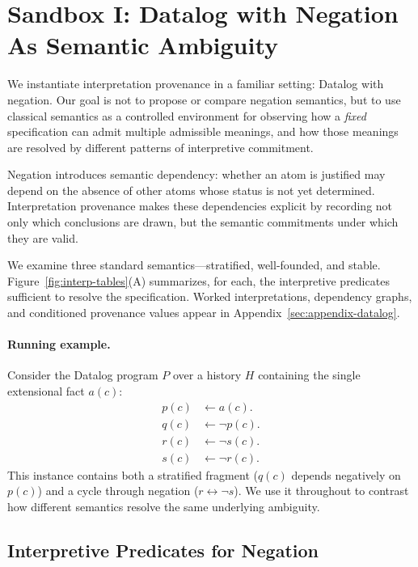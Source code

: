 \documentclass[acmsmall,nonacm]{acmart}
\theoremstyle{remark}
\numberwithin{definition}{section}
\numberwithin{theorem}{section}
\numberwithin{lemma}{section}
\numberwithin{corollary}{section}
\numberwithin{remark}{section}
\numberwithin{example}{section}
\numberwithin{observation}{section}
\numberwithin{assumption}{section}
\begin{document}
\section{Sandbox I: Datalog with Negation As Semantic Ambiguity}
\label{sec:negation}

We instantiate interpretation provenance in a familiar setting: Datalog with
negation.
Our goal is not to propose or compare negation semantics, but to use classical
semantics as a controlled environment for observing how a \emph{fixed}
specification can admit multiple admissible meanings, and how those meanings are
resolved by different patterns of interpretive commitment.

Negation introduces semantic dependency: whether an atom is justified may depend
on the absence of other atoms whose status is not yet determined.
Interpretation provenance makes these dependencies explicit by recording not only
which conclusions are drawn, but the semantic commitments under which they are
valid.

We examine three standard semantics—stratified, well-founded, and stable.
Figure~\ref{fig:interp-tables}(A) summarizes, for each, the interpretive predicates
sufficient to resolve the specification.
Worked interpretations, dependency graphs, and conditioned provenance values
appear in Appendix~\ref{sec:appendix-datalog}.

\paragraph{Running example.}
Consider the Datalog program $P$ over a history $H$ containing the single
extensional fact $a(c)$:
\begin{align*}
  p(c) &\leftarrow a(c).\\
  q(c) &\leftarrow \neg p(c).\\[1mm]
  r(c) &\leftarrow \neg s(c).\\
  s(c) &\leftarrow \neg r(c).
\end{align*}
This instance contains both a stratified fragment
($q(c)$ depends negatively on $p(c)$) and a cycle through negation
($r \leftrightarrow \neg s$).
We use it throughout to contrast how different semantics resolve the same
underlying ambiguity.

\subsection{Interpretive Predicates for Negation}
\end{document}
